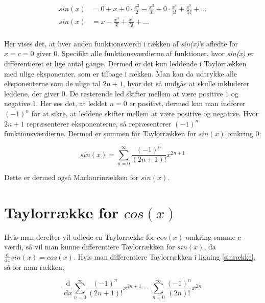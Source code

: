 \begin{align*}
sin(x) &= 0+x+0 \cdot \frac{x^2}{2}-\frac{x^3}{3!}+0 \cdot \frac{x^4}{4!}+\frac{x^5}{5!}+... \\
sin(x) &= x-\frac{x^3}{3!}+\frac{x^5}{5!}+... \\
\end{align*}

Her vises det, at hver anden funktionsværdi i rækken af \textit{sin(x)}'s afledte for $x=c=0$ giver $0$. Specifikt alle funktionsværdierne af funktioner, hvor \textit{sin(x)} er differentieret et lige antal gange. Dermed er det kun leddende i Taylorrækken med ulige eksponenter, som er tilbage i rækken. Man kan da udtrykke alle eksponenterne som de ulige tal $2n+1$, hvor det så undgås at skulle inkluderer leddene, der giver $0$. De resterende led skifter mellem at være positive $1$ og negative $1$. Her ses det, at leddet $n=0$ er positivt, dermed kan man indfører $(-1)^n$ for at sikre, at leddene skifter mellem at være positive og negative. Hvor $2n+1$ repræsenterer eksponenterne, så repræsenterer $(-1)^n$ funktionsværdierne. Dermed er summen for Taylorrækken for $sin(x)$ omkring $0$;

\begin{equation}\label{sinrække}
sin(x)=\sum_{n=0}^{\infty} \frac{(-1)^n}{(2n+1)!}x^{2n+1}
\end{equation}

Dette er dermed også Maclaurinrækken for $sin(x)$.




\section{Taylorrække for $cos(x)$}

Hvis man derefter vil udlede en Taylorrække for $cos(x)$ omkring samme $c$-værdi, så vil man kunne differentiere Taylorrækken for $sin(x)$, da $\frac{\mathrm{d}}{\mathrm{d}x}sin(x)=cos(x)$. Hvis man differentiere Taylorrækken i ligning \ref{sinrække}, så for man rækken;


\[
\frac{\mathrm{d}}{\mathrm{d}x} \sum_{n=0}^{\infty} \frac{(-1)^n}{(2n+1)!}x^{2n+1}
=
\sum_{n=0}^{\infty} \frac{(-1)^n}{(2n)!}x^{2n}
\]

